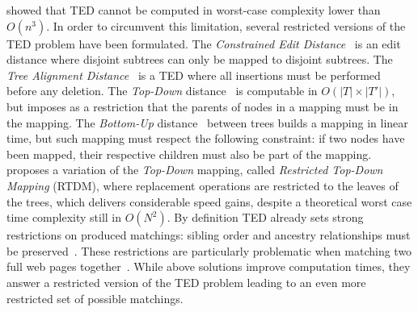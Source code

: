 \cite{bringmann2018tree} showed that TED cannot be computed in worst-case complexity lower than $O(n^3)$.
In order to circumvent this limitation, several restricted versions of the TED problem have been formulated.
The \textit{Constrained Edit Distance}~\cite{zhang1995algorithms, zhang1996constrained} is an edit distance where disjoint subtrees can only be mapped to disjoint subtrees.
The \textit{Tree Alignment Distance}~\cite{jiang1994alignment} is a TED where all insertions must be performed before any deletion.
The \textit{Top-Down} distance~\cite{selkow1977tree} is computable in $O(|T|\times|T'|)$, but imposes as a restriction that the parents of nodes in a mapping must be in the mapping.
The \textit{Bottom-Up} distance~\cite{valiente2001efficient} between trees builds a mapping in linear time, but such mapping must respect the following constraint: if two nodes have been mapped, their respective children must also be part of the mapping.
\cite{reis2004automatic} proposes a variation of the \textit{Top-Down} mapping, called \textit{Restricted Top-Down Mapping} (RTDM), where replacement operations are restricted to the leaves of the trees, which delivers considerable speed gains, despite a theoretical worst case time complexity still in $O(N^2)$.
By definition TED already sets strong restrictions on produced matchings: sibling order and ancestry relationships must be preserved~\cite{zhang1995algorithms}.
These restrictions are particularly problematic when matching two full web pages together~\cite{Kumar2011_Bricolage}.
While above solutions improve computation times, they answer a restricted version of the TED problem leading to an even more restricted set of possible matchings.

